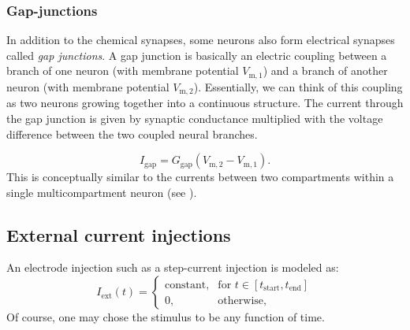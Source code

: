 

\subsubsection{Gap-junctions}
In addition to the chemical synapses, some neurons also form electrical synapses called \textit{gap junctions}. A gap junction is basically an electric coupling between a branch of one neuron (with membrane potential $V_\mathrm{m,1}$) and a branch of another neuron (with membrane potential $V_\mathrm{m,2}$). Essentially, we can think of this coupling as two neurons growing together into a continuous structure. The current through the gap junction is given by synaptic conductance multiplied with the voltage difference between the two coupled neural branches. 

\begin{equation}
I_\text{gap}=G_\text{gap} (V_\mathrm{m,2}-V_\mathrm{m,1}).
\label{eq:Neuron:gapjunction}
\end{equation}
This is conceptually similar to the currents between two compartments within a single multicompartment neuron (see ).


\subsection{External current injections}
An electrode injection such as a step-current injection is modeled as:
\begin{equation}
I_\text{ext}(t)= 
\begin{cases}
    \text{constant}, & \text{for } t \in [t_\mathrm{start}, t_\mathrm{end}] \\
    0,              & \text{otherwise},
\end{cases}
\label{eq:Neuron:injected}
\end{equation}
Of course, one may chose the stimulus to be any function of time.



